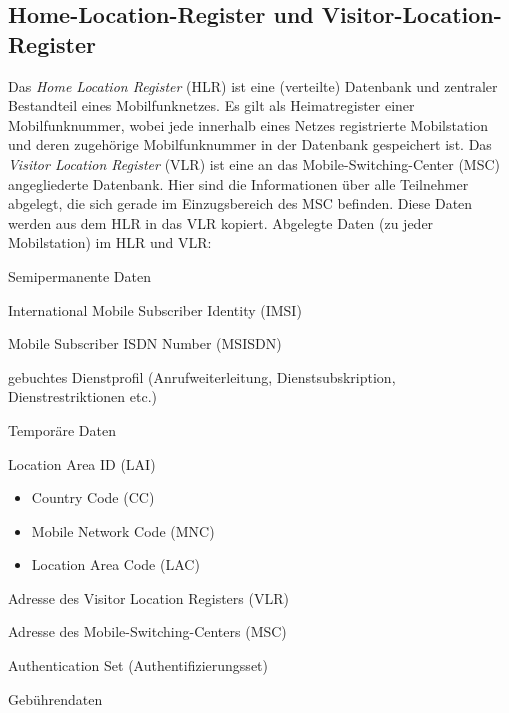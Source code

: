 \documentclass[loesung]{schulein}
\begin{document}
\subsection*{Home-Location-Register und Visitor-Location-Register}
Das \textit{Home Location Register} (HLR) ist eine (verteilte) Datenbank und zentraler Bestandteil eines Mobilfunknetzes. Es gilt als Heimatregister einer Mobilfunknummer, wobei jede innerhalb eines Netzes registrierte Mobilstation und deren zugehörige Mobilfunknummer in der Datenbank gespeichert ist. 
Das \textit{Visitor Location Register} (VLR) ist eine  an das Mobile-Switching-Center (MSC) angegliederte Datenbank. Hier sind die Informationen über alle Teilnehmer abgelegt, die sich gerade im Einzugsbereich des MSC befinden. Diese Daten werden aus dem HLR in das VLR kopiert.
Abgelegte Daten (zu jeder Mobilstation) im HLR und VLR:
\begin{smallitemize}
\item Semipermanente Daten
\begin{smallitemize}
\item International Mobile Subscriber Identity (IMSI)
\item Mobile Subscriber ISDN Number (MSISDN)
\item gebuchtes Dienstprofil (Anrufweiterleitung, Dienstsubskription, Dienstrestriktionen etc.)
\end{smallitemize}
\item Temporäre Daten
\begin{smallitemize}
\item Location Area ID (LAI)
\begin{itemize}
\item Country Code (CC)
\item Mobile Network Code (MNC)
\item Location Area Code (LAC)
\end{itemize} 
\item Adresse des Visitor Location Registers (VLR)
\item Adresse des Mobile-Switching-Centers (MSC)
\item Authentication Set (Authentifizierungsset)
\item Gebührendaten
\end{smallitemize}
\end{smallitemize}
\end{document}
